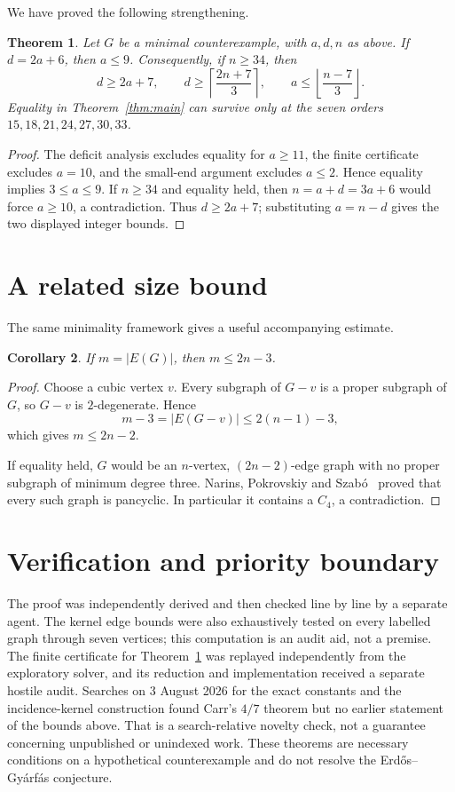 \documentclass[11pt]{article}
\newtheorem{theorem}{Theorem}
\newtheorem{corollary}[theorem]{Corollary}
\newcommand{\EG}{Erd\H{o}s--Gy\'arf\'as}
\begin{document}
We have proved the following strengthening.

\begin{theorem}\label{thm:plus-seven}
Let $G$ be a minimal counterexample, with $a,d,n$ as above.  If
$d=2a+6$, then $a\le9$.  Consequently, if $n\ge34$, then
\[
 d\ge2a+7,
 \qquad
 d\ge\left\lceil\frac{2n+7}{3}\right\rceil,
 \qquad
 a\le\left\lfloor\frac{n-7}{3}\right\rfloor.
\]
Equality in Theorem~\ref{thm:main} can survive only at the seven orders
$15,18,21,24,27,30,33$.
\end{theorem}

\begin{proof}
The deficit analysis excludes equality for $a\ge11$, the finite certificate
excludes $a=10$, and the small-end argument excludes $a\le2$.  Hence equality
implies $3\le a\le9$.  If $n\ge34$ and equality held, then
$n=a+d=3a+6$ would force $a\ge10$, a contradiction.  Thus $d\ge2a+7$;
substituting $a=n-d$ gives the two displayed integer bounds.
\end{proof}

\section{A related size bound}

The same minimality framework gives a useful accompanying estimate.

\begin{corollary}\label{cor:edges}
If $m=|E(G)|$, then $m\le2n-3$.
\end{corollary}

\begin{proof}
Choose a cubic vertex $v$.  Every subgraph of $G-v$ is a proper subgraph of
$G$, so $G-v$ is $2$-degenerate.  Hence
\[
 m-3=|E(G-v)|\le2(n-1)-3,
\]
which gives $m\le2n-2$.

If equality held, $G$ would be an $n$-vertex, $(2n-2)$-edge graph with no
proper subgraph of minimum degree three.  Narins, Pokrovskiy and
Szab\'o~\cite[Theorem~1.4]{NPS2017} proved that every such graph is
pancyclic.  In particular it contains a $C_4$, a contradiction.
\end{proof}

\section{Verification and priority boundary}

The proof was independently derived and then checked line by line by a
separate agent.  The kernel edge bounds were also exhaustively tested on
every labelled graph through seven vertices; this computation is an audit
aid, not a premise.  The finite certificate for
Theorem~\ref{thm:plus-seven} was replayed independently from the exploratory
solver, and its reduction and implementation received a separate hostile
audit.  Searches on 3 August 2026 for the exact constants and the
incidence-kernel construction found Carr's $4/7$ theorem but no earlier
statement of the bounds above.  That is a search-relative novelty check, not
a guarantee concerning unpublished or unindexed work.  These theorems are
necessary conditions on a hypothetical counterexample and do not resolve
the \EG{} conjecture.
\end{document}
